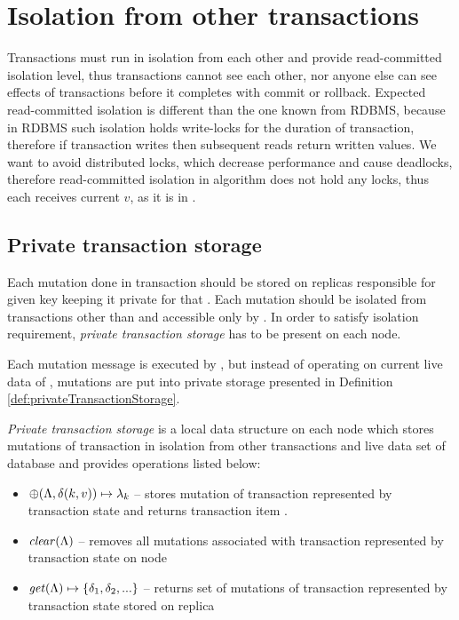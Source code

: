 
\section{Isolation from other transactions}
Transactions must run in isolation from each other and provide read-committed isolation level, thus transactions cannot see each other, nor anyone else can see effects of transactions before it completes with commit or rollback. Expected read-committed isolation is different than the one known from RDBMS, because in RDBMS such isolation holds write-locks for the duration of transaction, therefore if transaction writes then subsequent reads return written values. We want to avoid distributed locks, which decrease performance and cause deadlocks, therefore read-committed isolation in \mpt algorithm does not hold any locks, thus each \selectMessage receives current $v$, as it is in \database.

\subsection{Private transaction storage}
\label{sec:mpp:privateTxStorage}
Each mutation  done in transaction \transaction should be stored on replicas responsible for given key keeping it private for that \transaction. Each mutation should be isolated from transactions other than \transaction and accessible only by \transaction. In order to satisfy isolation requirement, \emph{private transaction storage} has to be present on each node.

Each mutation message is executed by , but instead of operating on current live data of \database, mutations \mutations are put into private storage presented in Definition \ref{def:privateTransactionStorage}. 

\begin{definition}
\label{def:privateTransactionStorage}
\emph{Private transaction storage} \txStorage is a local data structure on each node  which stores mutations \mutations of transaction \transaction in isolation from other transactions \transactions and live data set of database \database and provides operations listed below: 
  \begin{itemize}
    \item $\oplus(\text{$\Lambda$}, \text{$\delta(k, v)$}) \mapsto \text{$\lambda_{k}$}$ -- stores mutation  of transaction \transactionj represented by transaction state \txState and returns transaction item . 
    \item $\mathit{clear}(\text{$\Lambda$})$ -- removes all mutations \mutations associated with transaction \transactionj represented by transaction state \txState on node 
    \item $\mathit{get}(\text{$\Lambda$}) \mapsto \text{$\{\delta_{1}, \delta_{2}, ...\}$}$ -- returns set of mutations of transaction \transactionj represented by transaction state \txState stored on replica  
  \end{itemize}
\end{definition}

